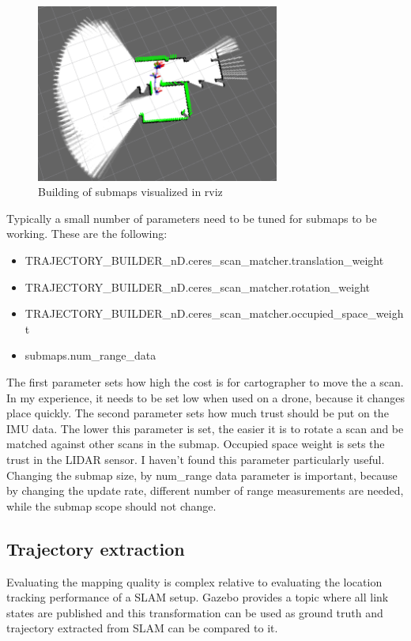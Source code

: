 \begin{figure}[!ht]
    \centering
    \includegraphics[width=80mm, keepaspectratio]{figures/cartographer_submaps.png}
    \caption{Building of submaps visualized in rviz}
    \label{fig:cartographer_submap_building}
\end{figure}

Typically a small number of parameters need to be tuned for submaps to be working. These are the following:
\begin{itemize}
    \item TRAJECTORY\_BUILDER\_nD.ceres\_scan\_matcher.translation\_weight
    \item TRAJECTORY\_BUILDER\_nD.ceres\_scan\_matcher.rotation\_weight
    \item TRAJECTORY\_BUILDER\_nD.ceres\_scan\_matcher.occupied\_space\_weight 
    \item submaps.num\_range\_data
\end{itemize}
The first parameter sets how high the cost is for cartographer to move the a scan. In my experience,
it needs to be set low when used on a drone, because it changes place quickly. The second parameter sets 
how much trust should be put on the IMU data. The lower this parameter is set, the easier it is to 
rotate a scan and be matched against other scans in the submap. Occupied space weight is sets the 
trust in the LIDAR sensor. I haven't found this parameter particularly useful. Changing the submap 
size, by num\_range data parameter is important, because by changing the update rate, different 
number of range measurements are needed, while the submap scope should not change.


\subsection{Trajectory extraction}\label{sect:trajectory_extraction}
Evaluating the mapping quality is complex relative to evaluating the location tracking performance
of a SLAM setup. Gazebo provides a topic where all link states are published and this transformation
can be used as ground truth and trajectory extracted from SLAM can be compared to it.

